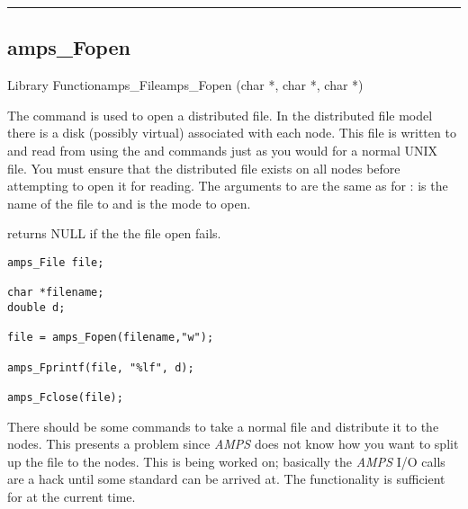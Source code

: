 
\noindent\rule{\textwidth}{1mm}

\subsection{amps\_Fopen}
\label{amps_Fopen}


\begin{deftypefn}{Library Function}{amps_File}{amps\_Fopen}
(char *, char *, char *)

\DESCRIPTION

The  command is used to open a distributed file.  In
the distributed file model there is a disk (possibly virtual) associated
with each node.  This file is written to and read from using the
 and  commands just as you would
for a normal UNIX file.  You must ensure that the distributed
file exists on all nodes before attempting to open it for reading.  The
arguments to  are the same as for :
 is the name of the file to and  is the mode to
open.

 returns NULL if the the file open fails.

\EXAMPLE
\begin{display}\begin{verbatim}
amps_File file;

char *filename;
double d;

file = amps_Fopen(filename,"w");

amps_Fprintf(file, "%lf", d);

amps_Fclose(file);
\end{verbatim}\end{display}

\NOTES

There should be some commands to take a normal file and distribute it
to the nodes.  This presents a problem since {\em AMPS} does not
know how you want to split up the file to the nodes.  This is being 
worked on; basically the {\em AMPS} I/O calls are a hack until some standard
can be arrived at.  The functionality is sufficient for \parflow{} at
the current time.


\end{deftypefn}
